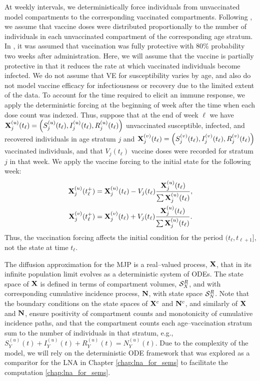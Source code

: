 At weekly intervals, we deterministically force individuals from unvaccinated model compartments to the corresponding vaccinated compartments. Following \cite{shubin2016revealing}, we assume that vaccine doses were distributed proportionally to the number of individuals in each unvaccinated compartment of the corresponding age stratum. In \cite{shubin2016revealing}, it was assumed that vaccination was fully protective with 80\% probability two weeks after administration. Here, we will assume that the vaccine is partially protective in that it reduces the rate at which vaccinated individuals become infected. We do not assume that VE for susceptibility varies by age, and also do not model vaccine efficacy for infectiousness or recovery due to the limited extent of the data. To account for the time required to elicit an immune response, we apply the deterministic forcing at the beginning of week after the time when each dose count was indexed. Thus, suppose that at the end of week $ \ell $ we have $ \mathbf{X}_j^{(u)}(t_\ell) = \left (S_j^{(u)}(t_\ell), I_j^{(u)}(t_\ell), R_j^{(u)}(t_\ell)\right ) $ unvaccinated susceptible, infected, and recovered individuals in age stratum $ j $ and $ \mathbf{X}_j^{(v)}(t_\ell) = \left (S_j^{(v)}(t_\ell), I_j^{(v)}(t_\ell), R_j^{(v)}(t_\ell)\right ) $ vaccinated individuals, and that $ V_j(t_\ell) $ vaccine doses were recorded for stratum $ j $ in that week. We apply the vaccine forcing to the initial state for the following week: 
\begin{align}
\label{eqn:vacc_forcing}
\begin{split}
	\mathbf{X}_{j}^{(u)}(t_\ell^+) &= \mathbf{X}_j^{(u)}(t_\ell) - V_j(t_\ell)\frac{\mathbf{X}_{j}^{(u)}(t_\ell)}{\sum\mathbf{X}_{j}^{(u)}(t_\ell)}, \\
	\mathbf{X}_{j}^{(v)}(t_\ell^+) &= \mathbf{X}_j^{(v)}(t_\ell) + V_j(t_\ell)\frac{\mathbf{X}_{j}^{(u)}(t_\ell)}{\sum\mathbf{X}_{j}^{(u)}(t_\ell)}.
\end{split}
\end{align}
Thus, the vaccination forcing affects the initial condition for the period $ (t_\ell,t_{\ell+1}] $, not the state at time $ t_\ell $. 

The diffusion approximation for the MJP is a real--valued process, $ \mathbf{X} $, that in its infinite population limit evolves as a deterministic system of ODEs. The state space of $ \mathbf{X} $ is defined in terms of compartment volumes, $ \mathcal{S}_X^R $, and with corresponding cumulative incidence process, $ \mathbf{N} $, with state space $ \mathcal{S}_N^R $. Note that the boundary conditions on the state spaces of $ \mathbf{X}^c $ and $ \mathbf{N}^c $, and similarly of $ \mathbf{X} $ and $ \mathbf{N} $, ensure positivity of compartment counts and monotonicity of cumulative incidence paths, and that the compartment counts each age--vaccination stratum sum to the number of individuals in that stratum, e.g., $ S_{Y}^{(u)}(t) + I_{Y}^{(u)}(t) + R_{Y}^{(u)}(t) = N_{Y}^{(u)}(t) $. Due to the complexity of the model, we will rely on the deterministic ODE framework that was explored as a comparitor for the LNA in Chapter \ref{chap:lna_for_sems} to facilitate the computation \ref{chap:lna_for_sems}.  

